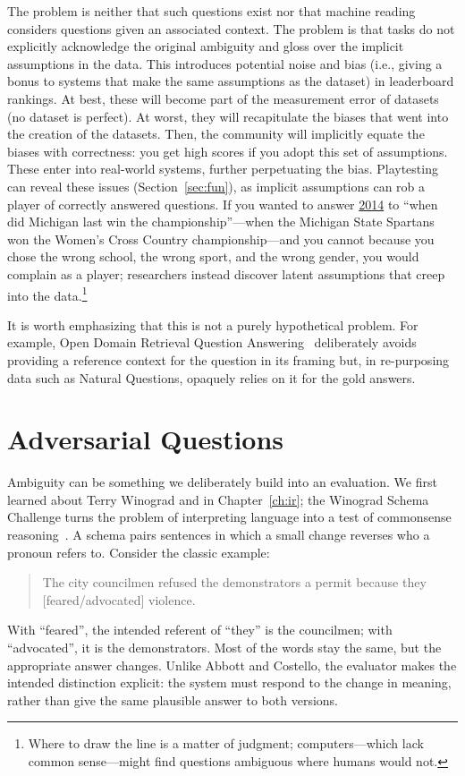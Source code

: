The problem is neither that such questions exist nor that machine
reading  considers questions given an associated context.
The problem is that tasks do not explicitly acknowledge the original
ambiguity and gloss over the implicit assumptions in the data.
This introduces potential noise and bias (i.e., giving a bonus to systems that make
the same assumptions as the dataset) in leaderboard rankings. 
At best, these will become part of
the measurement error of datasets (no dataset is perfect). 
At worst, they will recapitulate the biases that went into the creation of the datasets.
Then, the community will implicitly equate the biases with correctness: you get high scores if you 
adopt this set of assumptions.
These enter into real-world systems, further perpetuating the bias.
Playtesting can reveal these issues (Section~\ref{sec:fun}), as implicit assumptions 
can rob a player of correctly answered questions.
If you wanted to answer \underline{2014} to ``when did Michigan last win the championship''---when the Michigan State Spartans won the Women's Cross Country championship---and you cannot because you chose the wrong school, the wrong sport, and the wrong gender,
you would complain as a player; researchers instead discover latent assumptions that creep into the data.\footnote{Where to draw the line is a matter of judgment; computers---which lack common sense---might find questions ambiguous where humans would not.}

It is worth emphasizing that this is not a purely hypothetical problem. For example, Open Domain Retrieval Question Answering~\citep{lee-19} deliberately avoids providing a reference context for the question in its framing but, in re-purposing data such as Natural Questions, opaquely relies on it for the gold answers.

\section{Adversarial Questions}
\label{sec:leaderboards:adversarial}

Ambiguity can be something we deliberately build into an evaluation.
We first learned about Terry Winograd and  in
Chapter~\ref{ch:ir}; the Winograd Schema Challenge turns the problem of
interpreting language into a test of commonsense reasoning~\citep{levesque-12}.
A schema pairs sentences in which a small change reverses who a pronoun
refers to.  Consider the classic example:
\begin{quote}
The city councilmen refused the demonstrators a permit because they
[feared/advocated] violence.
\end{quote}
With ``feared'', the intended referent of ``they'' is the councilmen;
with ``advocated'', it is the demonstrators.  Most of the words stay the
same, but the appropriate answer changes.  Unlike Abbott and Costello,
the evaluator makes the intended distinction explicit: the system must
respond to the change in meaning, rather than give the same plausible
answer to both versions.


